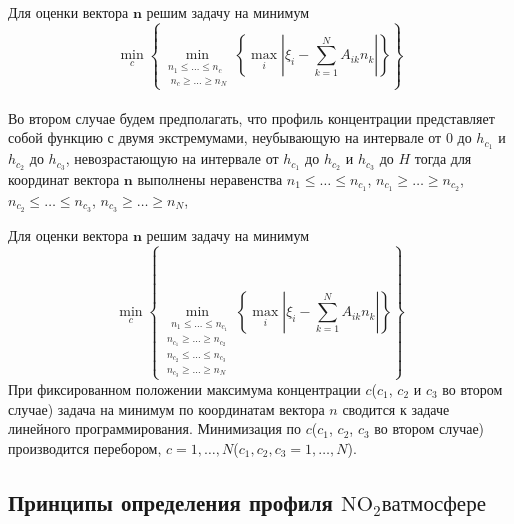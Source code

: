 \documentclass[a4paper,14pt]{article}
\theoremstyle{plain}
\theoremstyle{definition}
\theoremstyle{remark}
\newcommand{\nl}{\\ \indent}
\begin{document}
Для оценки вектора $\textbf{n}$ решим задачу на минимум
\begin{equation}
\min_{c}
\left\{
\min_{
\substack{
n_1 \leq \ldots \leq n_c \\
\; n_c \geq \ldots \geq n_N}
}
\left\{
\max_i
\left|
\xi_i -
\sum_{k=1}^{N}
A_{ik}n_k
\right|
\right\}
\right\}
\label{post_2}
\end{equation}
\nl 
Во втором случае будем предполагать, что профиль концентрации
представляет собой функцию с двумя экстремумами, неубывающую 
на интервале от $0$ до $h_{c_1}$ и $h_{c_2}$ до $h_{c_3}$,
невозрастающую на интервале от $h_{c_1}$ до $h_{c_2}$ и
$h_{c_3}$ до $H$ тогда для координат вектора 
$\textbf{n}$ выполнены неравенства 
$n_1 \leq \ldots \leq n_{c_1}$, 
$n_{c_1} \geq \ldots \geq n_{c_2}$,
$n_{c_2} \leq \ldots \leq n_{c_3}$,
$n_{c_3} \geq \ldots \geq n_{N}$,
 
Для оценки вектора $\textbf{n}$ решим задачу на минимум
\begin{equation}
\min_{c}
\left\{
\min_{\substack{
\; \, n_1 \leq \ldots \leq n_{c_1} \\
n_{c_1} \geq \ldots \geq n_{c_2} \\
n_{c_2} \leq \ldots \leq n_{c_3} \\
n_{c_3} \geq \ldots \geq n_{N}}
}
\left\{
\max_i
\left|
\xi_i -
\sum_{k=1}^{N}
A_{ik}n_k
\right|
\right\}
\right\}
\label{post_3}
\end{equation}
При фиксированном положении максимума концентрации 
$c$($c_1$, $c_2$ и $c_3$ во втором случае)
задача на минимум по координатам вектора $n$ сводится к задаче
линейного программирования. Минимизация по $c$($c_1$, $c_2$,
$c_3$ во втором случае) производится перебором, 
$c=1, \ldots,N$($c_1, c_2, c_3=1, \ldots,N$).


\subsection{Принципы определения профиля $\text{NO}_2 в атмосфере$}
\end{document}
